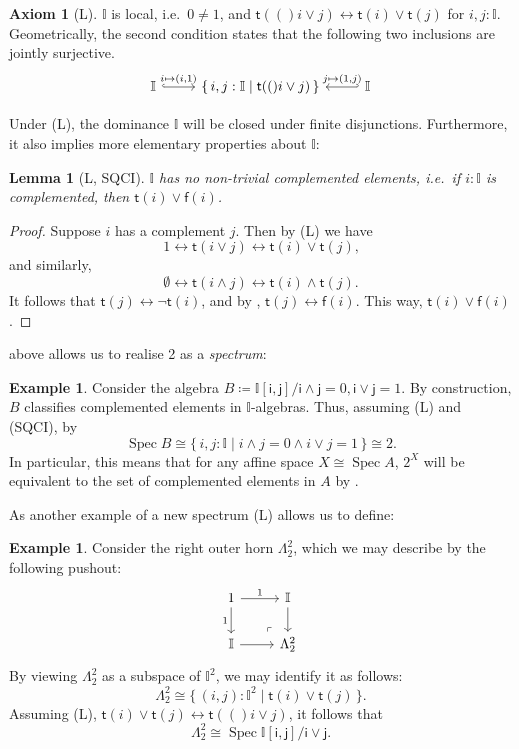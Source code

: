 \documentclass[a4paper,12pt]{amsart}
\newtheorem{lemma}[theorem]{Lemma}
\theoremstyle{definition}
\newtheorem{example}[theorem]{Example}
\newtheorem*{axiom}{Axiom}
\newcommand{\mbb}[1]{\mathbb{#1}}
\newcommand{\I}{\mbb I}
\newcommand{\ms}[1]{\mathsf{#1}}
\newcommand{\scomp}[2]{\{\,#1\mid#2\,\}}
\newcommand{\emp}{\emptyset}
\newcommand{\eq}{\leftrightarrow}
\newcommand{\spec}{\operatorname{Spec}}
\newcommand\istsym{\ms{t}}
\newcommand\isfsym{\ms{f}}
\newcommand\ist[1]{\istsym(#1)}
\newcommand\isf[1]{\isfsym(#1)}
\begin{document}
\begin{axiom}[L]\label{ax:L}
  $\I$ is local, i.e.\ $0 \neq 1$, and $\ist(i\vee j) \eq \ist{i} \vee \ist{j}$ for $i,j : \I$. Geometrically, the second condition states that the following two inclusions are jointly surjective. 
  \[ 
  \begin{tikzcd}
    \I \ar[r, hook, "{i \mapsto (i,1)}"] & \scomp{i,j : \I}{\ist(i\vee j)} & \I \ar[l, hook', "{j \mapsto (1,j)}"']
  \end{tikzcd}
  \]
\end{axiom}

Under (L), the dominance $\I$ will be closed under finite disjunctions. Furthermore, it also implies more elementary properties about $\I$:

\begin{lemma}[L, SQCI]\label{lem:intisnotBoolean}
  $\I$ has no non-trivial complemented elements, i.e.\ if $i : \I$ is complemented, then $\ist{i} \vee \isf{i}$. 
\end{lemma}
\begin{proof}
  Suppose $i$ has a complement $j$. Then by (L) we have
  \[ 1 \eq \ist{i\vee j} \eq \ist{i} \vee \ist{j}\text{,} \]
  and similarly,
  \[ \emp \eq \ist{i\wedge j} \eq \ist{i} \wedge \ist{j}\text{.} \]
  It follows that $\ist{j} \eq \neg \ist{i}$, and by , $\ist{j} \eq \isf{i}$. This way, $\ist{i} \vee \isf{i}$.
\end{proof}

 above allows us to realise 2 as a \emph{spectrum}:

\begin{example}\label{exm:2isaffine}
  Consider the algebra $B \coloneq \I[\ms{i},\ms{j}]/{\ms{i}\wedge \ms{j} =0,\ms{i}\vee \ms{j} = 1}$. By construction, $B$ classifies complemented elements in $\I$-algebras. Thus, assuming (L) and (SQCI), by 
  \[ \spec B \cong \scomp{i,j : \I}{i \wedge j = 0 \wedge i \vee j = 1} \cong 2\text{.} \]
  In particular, this means that for any affine space $X \cong \spec A$, $2^X$ will be equivalent to the set of complemented elements in $A$ by .
\end{example}

As another example of a new spectrum (L) allows us to define:

\begin{example}\label{exm:hornaffine}
  Consider the right outer horn $\Lambda^2_2$, which we may describe by the following pushout:
  \[
    \begin{tikzcd}
      1 \ar[d, "1"'] \ar[r, "1"] & \I \ar[d] \\
      \I \ar[r] & \Lambda^2_2
      \arrow["\lrcorner"{anchor=center, pos=0.125, rotate=180}, draw=none, from=2-2, to=1-1]
    \end{tikzcd}
  \]
  By viewing $\Lambda^2_2$ as a subspace of $\I^2$, we may identify it as follows:
  \[ \Lambda^2_2 \cong \scomp{(i,j) : \I^2}{\ist{i} \vee \ist{j}}\text{.} \]
  Assuming (L), $\ist{i} \vee \ist{j} \eq \ist(i\vee j)$, it follows that 
  \[ \Lambda^2_2 \cong \spec \I[\ms{i},\ms{j}]/\ms{i} \vee \ms{j}\text{.} \]
\end{example}
\end{document}
